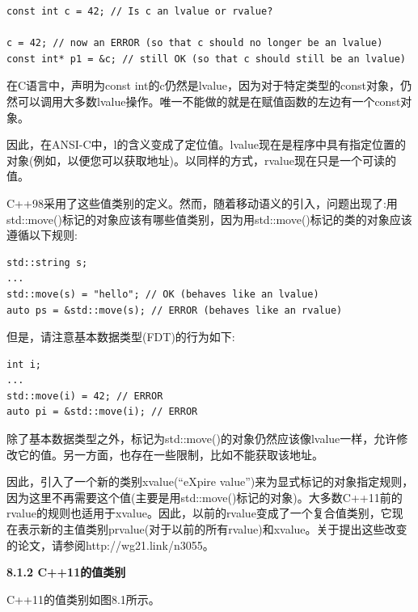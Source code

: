 \begin{lstlisting}[caption={}]
const int c = 42; // Is c an lvalue or rvalue?

c = 42; // now an ERROR (so that c should no longer be an lvalue)
const int* p1 = &c; // still OK (so that c should still be an lvalue)
\end{lstlisting}

在C语言中，声明为const int的c仍然是lvalue，因为对于特定类型的const对象，仍然可以调用大多数lvalue操作。唯一不能做的就是在赋值函数的左边有一个const对象。\par

因此，在ANSI-C中，l的含义变成了定位值。lvalue现在是程序中具有指定位置的对象(例如，以便您可以获取地址)。以同样的方式，rvalue现在只是一个可读的值。\par

C++98采用了这些值类别的定义。然而，随着移动语义的引入，问题出现了:用std::move()标记的对象应该有哪些值类别，因为用std::move()标记的类的对象应该遵循以下规则:\par

\begin{lstlisting}[caption={}]
std::string s;
...
std::move(s) = "hello"; // OK (behaves like an lvalue)
auto ps = &std::move(s); // ERROR (behaves like an rvalue)
\end{lstlisting}

但是，请注意基本数据类型(FDT)的行为如下:\par

\begin{lstlisting}[caption={}]
int i;
...
std::move(i) = 42; // ERROR
auto pi = &std::move(i); // ERROR
\end{lstlisting}

除了基本数据类型之外，标记为std::move()的对象仍然应该像lvalue一样，允许修改它的值。另一方面，也存在一些限制，比如不能获取该地址。\par

因此，引入了一个新的类别xvalue(“eXpire value”)来为显式标记的对象指定规则，因为这里不再需要这个值(主要是用std::move()标记的对象)。大多数C++11前的rvalue的规则也适用于xvalue。因此，以前的rvalue变成了一个复合值类别，它现在表示新的主值类别prvalue(对于以前的所有rvalue)和xvalue。关于提出这些改变的论文，请参阅http://wg21.link/n3055。\par

\hspace*{\fill} \par %
\textbf{8.1.2 C++11的值类别}

C++11的值类别如图8.1所示。\par

